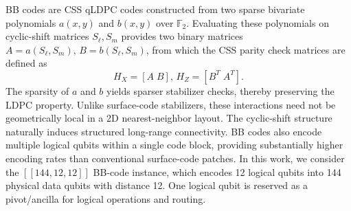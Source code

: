 \documentclass[sigconf]{acmart}
\begin{document}
BB codes are CSS qLDPC codes constructed from two sparse bivariate polynomials $a(x,y)$ and $b(x,y)$ over $\mathbb{F}_2$. Evaluating these polynomials on cyclic-shift matrices $S_\ell, S_m$ provides two binary matrices $A = a(S_\ell,S_m),\, B = b(S_\ell, S_m)$, from which the CSS parity check matrices are defined as
$$H_X = [A \; B], \,H_Z = [B^T \; A^T].$$
The sparsity of $a$ and $b$ yields sparser stabilizer checks, thereby preserving the LDPC property. Unlike surface-code stabilizers, these interactions need not be geometrically local in a 2D nearest-neighbor layout. The cyclic-shift structure naturally induces structured long-range connectivity. BB codes also encode multiple logical qubits within a single code block, providing substantially higher encoding rates than conventional surface-code patches. In this work, we consider the $\left[[144,12,12]\right]$ BB-code instance, which encodes 12 logical qubits into 144 physical data qubits with distance 12. One logical qubit is reserved as a pivot/ancilla for logical operations and routing.
\end{document}
